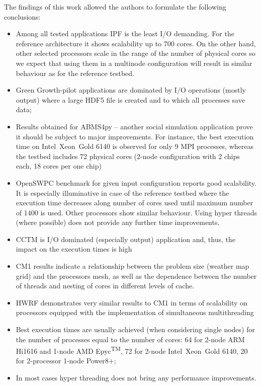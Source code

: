 The findings of this work allowed the authors to formulate the following conclusions:
\begin{itemize}
  \item[\textbullet]Among all tested applications IPF is the least I/O demanding. For the reference architecture it shows scalability up to 700 cores. On the other hand, other selected processors scale in the range of the number of physical cores so we expect that using them in a multinode configuration will result in similar behaviour as for the reference testbed.
  \item[\textbullet]Green Growth-pilot applications are dominated by I/O operations (mostly output) where a large HDF5 file is created and to which all processes save data;
  \item[\textbullet]Results obtained for ABMS4py – another social simulation application prove it should be subject to major improvements. For instance, the best execution time on Intel\textregistered\ Xeon\textregistered\ Gold 6140 is observed for only 9 MPI processes, whereas the testbed includes 72 physical cores (2-node configuration with 2 chips each, 18 cores per one chip)
  \item[\textbullet]OpenSWPC benchmark for given input configuration reports good scalability. It is especially illuminative in case of the reference testbed where the execution time decreases along number of cores used until maximum number of 1400 is used. Other processors show similar behaviour. Using hyper threads (where possible) does not provide any further time improvements.
  \item[\textbullet]CCTM is I/O dominated (especially output) application and, thus, the impact on the execution times is high
  \item[\textbullet]CM1 results indicate a relationship between the problem size (weather map grid) and the processors mesh, as well as the dependence between the number of threads and nesting of cores in different levels of cache. 
  \item[\textbullet]HWRF demonstrates very similar results to CM1 in terms of scalability on processors equipped with the implementation of simultaneous multithreading 
  \item[\textbullet]Best execution times are usually achieved (when considering single nodes) for the number of processes equal to the number of cores: 64 for 2-node ARM Hi1616 and 1-node AMD Epyc\textsuperscript{TM}, 72 for 2-node Intel\textregistered\ Xeon\textregistered\ Gold 6140, 20 for 2-processor 1-node Power8+;
  \item[\textbullet]In most cases hyper threading does not bring any performance improvements.
\end{itemize}
